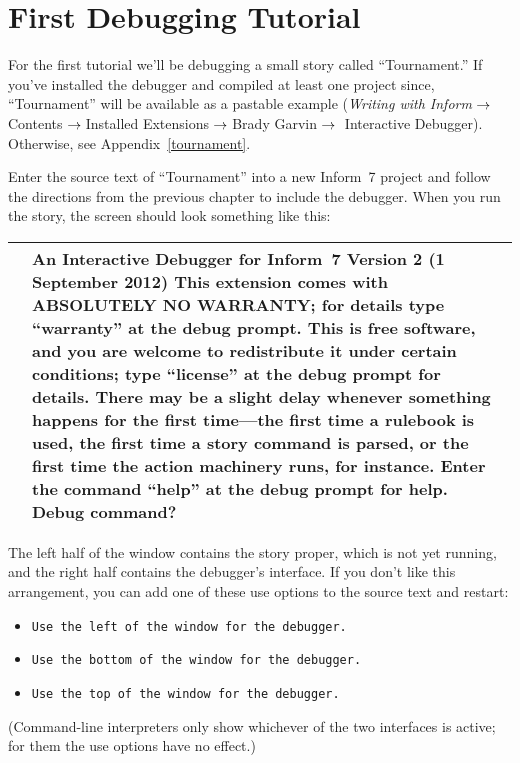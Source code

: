 \documentclass{book}
\newcommand{\lastpagebreak}{\vfill\pagebreak}
\newcommand{\nil}{{\null}}
\newcommand{\thento}{\(\nil\rightarrow\nil\)}
\newcommand{\n}{\hspace*{\fill}\newline}
\newcommand{\terp}[2]{\begin{center}\begin{tabular}{p{0.45\textwidth}|p{0.45\textwidth}}\midrule #1&#2\\\midrule\end{tabular}\end{center}}
\newcommand{\glkheading}[1]{\textbf{#1}}
\newcommand{\cursor}{\raisebox{-1.5pt}{\RectangleThin}}
\begin{document}
\lastpagebreak

\section{First Debugging Tutorial}
\label{first}

For the first tutorial we'll be debugging a small story called ``Tournament.''
If you've installed the debugger and compiled at least one project since,
``Tournament'' will be available as a pastable example (\emph{Writing with
  Inform}\thento Contents\thento Installed Extensions\thento Brady Garvin\thento
Interactive Debugger).  Otherwise, see Appendix~\ref{tournament}.

Enter the source text of ``Tournament'' into a new Inform~7 project and follow
the directions from the previous chapter to include the debugger.  When you run
the story, the screen should look something like this:

\terp{\null}{%
  \glkheading{An Interactive Debugger for Inform~7}\n
  \glkheading{Version 2 (1 September 2012)}\n
  \n
  This extension comes with ABSOLUTELY NO WARRANTY; for details type ``warranty'' at the debug prompt.\n
  \n
  This is free software, and you are welcome to redistribute it under certain conditions; type ``license'' at the debug prompt for details.\n
  \n
  There may be a slight delay whenever something happens for the first time---the first time a rulebook is used, the first time a story command is parsed, or the first time the action machinery runs, for instance.\n
  \n
  Enter the command ``help'' at the debug prompt for help.\n
  \n
  Debug command?\ \cursor}

The left half of the window contains the story proper, which is not yet running,
and the right half contains the debugger's interface.  If you don't like this
arrangement, you can add one of these use options to the source text and
restart:

\begin{itemize}
  \item{\lstinline{Use the left of the window for the debugger.}}
  \item{\lstinline{Use the bottom of the window for the debugger.}}
  \item{\lstinline{Use the top of the window for the debugger.}}
\end{itemize}

(Command-line interpreters only show whichever of the two interfaces is active;
for them the use options have no effect.)
\end{document}
